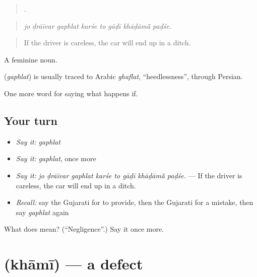 \begin{quote}
       .
\end{quote}

\begin{quote}
\emph{jo ḍrāīvar gaphlat karśe to gāḍī khāḍāmā̃ paḍśe.}
\end{quote}

\begin{quote}
If the driver is careless, the car will end up in a ditch.
\end{quote}

A feminine noun.

\begin{cousinweb}
\textbf{} (\emph{gaphlat}) is usually traced to Arabic \emph{ghaflat}, \textquotedblleft{}heedlessness\textquotedblright{}, through Persian.
\end{cousinweb}

\begin{grammarlens}[title={What you've built}]
One more word for saying what happens if.
\end{grammarlens}

\subsection*{Your turn}
\begin{itemize}
\raggedright
  \item \emph{Say it:} \emph{gaphlat}
  \item \emph{Say it:} \emph{gaphlat}, once more
  \item \emph{Say it:} \emph{jo ḍrāīvar gaphlat karśe to gāḍī khāḍāmā̃ paḍśe.} — If the driver is careless, the car will end up in a ditch.
  \item \emph{Recall:} say the Gujarati for to provide, then the Gujarati for a mistake, then say \emph{gaphlat} again
\end{itemize}

\begin{tcolorbox}[breakable,colback=teal!4,colframe=teal!35!black,title={Before you move on}]
What does  mean? (\textquotedblleft{}Negligence\textquotedblright{}.) Say it once more.
\end{tcolorbox}
\section[\texorpdfstring{\gu{ખામી} (khāmī)}{ખામી (khāmī)}]{ (khāmī) — a defect}


